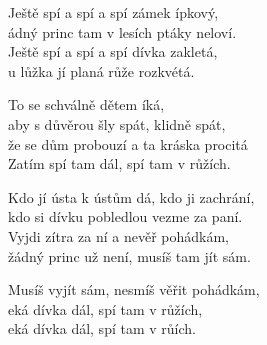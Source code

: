
\ve{}
Ještě spí a spí a spí zámek ípkový,\\
ádný princ tam v lesích ptáky neloví.\\
Ještě spí a spí a spí dívka zakletá,\\
u lůžka jí planá růže rozkvétá.

\cho{}
To se schválně dětem íká,\\
aby s důvěrou šly spát, klidně spát,\\
že se dům probouzí a ta kráska procitá\\
Zatím spí tam dál, spí tam v růžích.

\ve{}
Kdo jí ústa k ústům dá, kdo ji zachrání,\\
kdo si dívku pobledlou vezme za paní.\\
Vyjdi zítra za ní a nevěř pohádkám,\\
žádný princ už není, musíš tam jít sám.

\cho{}

\ve{}
Musíš vyjít sám, nesmíš věřit pohádkám,\\
eká dívka dál, spí tam v růžích,\\
eká dívka dál, spí tam v \hspace{1em} růích. 

\esong